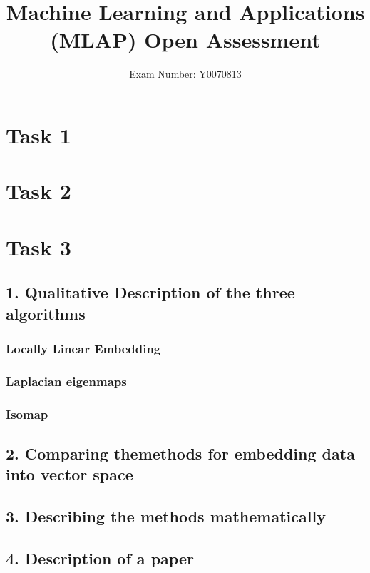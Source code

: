 \documentclass{article}
\begin{document}
	\title{Machine Learning and Applications (MLAP) Open Assessment}
	\author{Exam Number: Y0070813}
	\maketitle
	\section{Task 1}
	\section{Task 2}
	\section{Task 3}
	\subsection{1. Qualitative Description of the three algorithms}
		\subsubsection{Locally Linear Embedding}
		\subsubsection{Laplacian eigenmaps}
		\subsubsection{Isomap}
	\subsection{2. Comparing themethods for embedding data into vector space}
	\subsection{3. Describing the methods mathematically}
	\subsection{4. Description of a paper}
	
\end{document}
